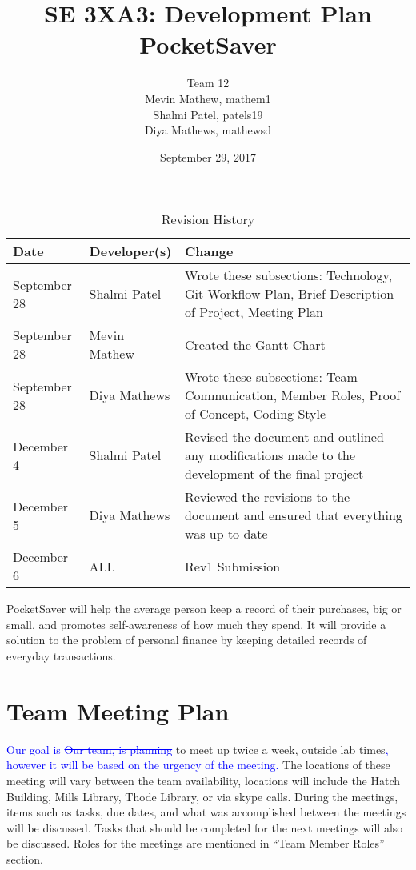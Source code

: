 \documentclass{article}
\title{SE 3XA3: Development Plan\\PocketSaver}
\author{Team 12
		\\ Mevin Mathew, mathem1
		\\ Shalmi Patel, patels19
		\\ Diya Mathews, mathewsd
}
\date{September 29, 2017}
\begin{document}
\maketitle
\newpage
\begin{table}[hp]
\caption{Revision History} \label{TblRevisionHistory}
\begin{tabularx}{\textwidth}{llX}
\toprule
\textbf{Date} & \textbf{Developer(s)} & \textbf{Change}\\
\midrule
September 28 & Shalmi Patel & Wrote these subsections: Technology, Git Workflow Plan, Brief Description of Project, Meeting Plan\\
September 28 & Mevin Mathew & Created the Gantt Chart\\
September 28 & Diya Mathews & Wrote these subsections: Team Communication, Member Roles, Proof of Concept, Coding Style\\
\midrule
December 4 & Shalmi Patel & Revised the document and outlined any modifications made to the development of the final project\\
December 5 & Diya Mathews & Reviewed the revisions to the document and ensured that everything was up to date\\
December 6 & ALL & Rev1 Submission\\
\bottomrule
\end{tabularx}
\end{table}

\newpage
\tableofcontents
\newpage


PocketSaver will help the average person keep a record of their purchases, big or small, and promotes self-awareness of how much they spend. It will provide a solution to the problem of personal finance by keeping detailed records of everyday transactions.

\section{Team Meeting Plan}
\textcolor{blue}{Our goal is \st {Our team, is planning}} to meet up twice a week, outside lab times\textcolor{blue}{, however it will be based on the urgency of the meeting.} The locations of these meeting will vary between the team availability, locations will include the Hatch Building, Mills Library, Thode Library, or via skype calls. During the meetings, items such as tasks, due dates, and what was accomplished between the meetings will be discussed. Tasks that should be completed for the next meetings will also be discussed. Roles for the meetings are mentioned in “Team Member Roles” section.
\end{document}
